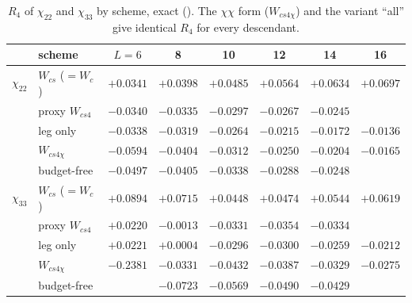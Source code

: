 \begin{table}[ht]
\centering\footnotesize\renewcommand{\arraystretch}{1.15}
\begin{tabular}{@{}llcccccc@{}}
\toprule
 & scheme & $L=6$ & 8 & 10 & 12 & 14 & 16 \\\midrule
$\chi_{22}$ & $W_{cs}$ ($=W_c$) & $+0.0341$ & $+0.0398$ & $+0.0485$ & $+0.0564$ & $+0.0634$ & $+0.0697$ \\
 & proxy $W_{cs4}$ & $-0.0340$ & $-0.0335$ & $-0.0297$ & $-0.0267$ & $-0.0245$ & \\
 & leg only & $-0.0338$ & $-0.0319$ & $-0.0264$ & $-0.0215$ & $-0.0172$ & $-0.0136$ \\
 & $W_{cs4\chi}$ & $-0.0594$ & $-0.0404$ & $-0.0312$ & $-0.0250$ & $-0.0204$ & $-0.0165$ \\
 & budget-free & $-0.0497$ & $-0.0405$ & $-0.0338$ & $-0.0288$ & $-0.0248$ & \\\midrule
$\chi_{33}$ & $W_{cs}$ ($=W_c$) & $+0.0894$ & $+0.0715$ & $+0.0448$ & $+0.0474$ & $+0.0544$ & $+0.0619$ \\
 & proxy $W_{cs4}$ & $+0.0220$ & $-0.0013$ & $-0.0331$ & $-0.0354$ & $-0.0334$ & \\
 & leg only & $+0.0221$ & $+0.0004$ & $-0.0296$ & $-0.0300$ & $-0.0259$ & $-0.0212$ \\
 & $W_{cs4\chi}$ & $-0.2381$ & $-0.0331$ & $-0.0432$ & $-0.0387$ & $-0.0329$ & $-0.0275$ \\
 & budget-free & & $-0.0723$ & $-0.0569$ & $-0.0490$ & $-0.0429$ & \\
\bottomrule
\end{tabular}
\caption{$R_4$ of $\chi_{22}$ and $\chi_{33}$ by scheme, exact (). The
$\chi\chi$ form ($W_{cs4\chi}$) and the variant ``all'' give identical $R_4$ for every descendant.}
\label{htp:d2:tab:r4chi}
\end{table}

